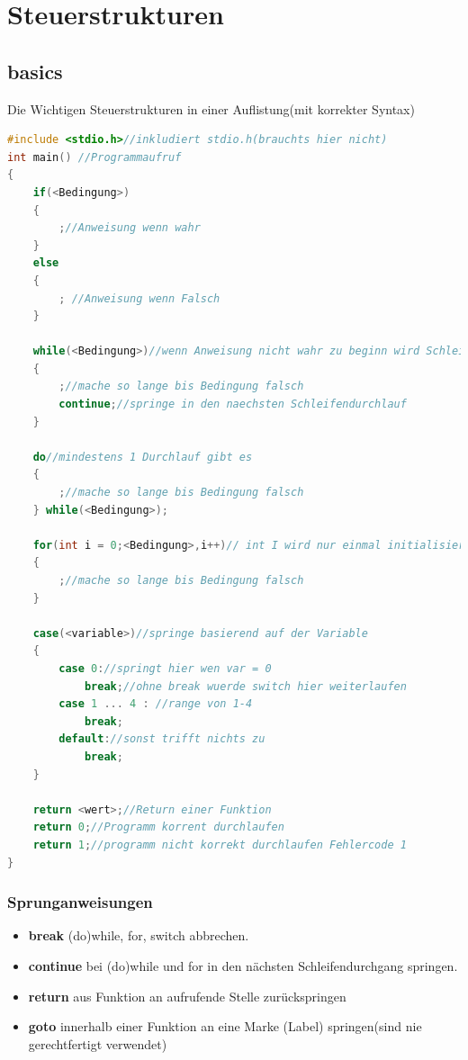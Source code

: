 \newpage
\section{Steuerstrukturen}
\subsection{basics}
Die Wichtigen Steuerstrukturen in einer Auflistung(mit korrekter Syntax) 

\begin{lstlisting}[language = c]
#include <stdio.h>//inkludiert stdio.h(brauchts hier nicht)
int main() //Programmaufruf
{
    if(<Bedingung>)
    {
        ;//Anweisung wenn wahr
    }
    else
    {
        ; //Anweisung wenn Falsch
    }

    while(<Bedingung>)//wenn Anweisung nicht wahr zu beginn wird Schleife nicht betreten
    {
        ;//mache so lange bis Bedingung falsch
        continue;//springe in den naechsten Schleifendurchlauf
    }

    do//mindestens 1 Durchlauf gibt es
    {
        ;//mache so lange bis Bedingung falsch
    } while(<Bedingung>);

    for(int i = 0;<Bedingung>,i++)// int I wird nur einmal initialisiert und i wird immer nach dem schleifendurchgang initialisiert
    {
        ;//mache so lange bis Bedingung falsch
    }

    case(<variable>)//springe basierend auf der Variable
    {
        case 0://springt hier wen var = 0
            break;//ohne break wuerde switch hier weiterlaufen
        case 1 ... 4 : //range von 1-4
            break;
        default://sonst trifft nichts zu
            break;
    }

    return <wert>;//Return einer Funktion
    return 0;//Programm korrent durchlaufen
    return 1;//programm nicht korrekt durchlaufen Fehlercode 1    
}
\end{lstlisting}

\subsubsection{Sprunganweisungen}

\begin{itemize}[itemsep=1pt, parsep=0pt]
    \item \textbf{break} \newline (do)while, for, switch abbrechen.
    \item \textbf{continue} \newline bei (do)while und for in den nächsten Schleifendurchgang springen.
    \item \textbf{return} \newline aus Funktion an aufrufende Stelle zurückspringen
    \item \textbf{goto} \newline innerhalb einer Funktion an eine Marke (Label) springen(sind nie gerechtfertigt verwendet)
\end{itemize}

